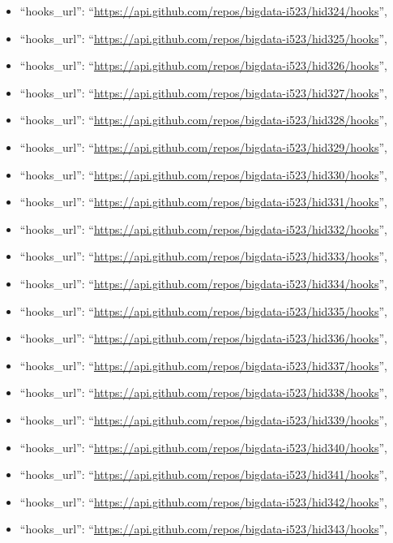 \begin{itemize}
\item
  ``hooks\_url'':
  ``\url{https://api.github.com/repos/bigdata-i523/hid324/hooks}'',
\item
  ``hooks\_url'':
  ``\url{https://api.github.com/repos/bigdata-i523/hid325/hooks}'',
\item
  ``hooks\_url'':
  ``\url{https://api.github.com/repos/bigdata-i523/hid326/hooks}'',
\item
  ``hooks\_url'':
  ``\url{https://api.github.com/repos/bigdata-i523/hid327/hooks}'',
\item
  ``hooks\_url'':
  ``\url{https://api.github.com/repos/bigdata-i523/hid328/hooks}'',
\item
  ``hooks\_url'':
  ``\url{https://api.github.com/repos/bigdata-i523/hid329/hooks}'',
\item
  ``hooks\_url'':
  ``\url{https://api.github.com/repos/bigdata-i523/hid330/hooks}'',
\item
  ``hooks\_url'':
  ``\url{https://api.github.com/repos/bigdata-i523/hid331/hooks}'',
\item
  ``hooks\_url'':
  ``\url{https://api.github.com/repos/bigdata-i523/hid332/hooks}'',
\item
  ``hooks\_url'':
  ``\url{https://api.github.com/repos/bigdata-i523/hid333/hooks}'',
\item
  ``hooks\_url'':
  ``\url{https://api.github.com/repos/bigdata-i523/hid334/hooks}'',
\item
  ``hooks\_url'':
  ``\url{https://api.github.com/repos/bigdata-i523/hid335/hooks}'',
\item
  ``hooks\_url'':
  ``\url{https://api.github.com/repos/bigdata-i523/hid336/hooks}'',
\item
  ``hooks\_url'':
  ``\url{https://api.github.com/repos/bigdata-i523/hid337/hooks}'',
\item
  ``hooks\_url'':
  ``\url{https://api.github.com/repos/bigdata-i523/hid338/hooks}'',
\item
  ``hooks\_url'':
  ``\url{https://api.github.com/repos/bigdata-i523/hid339/hooks}'',
\item
  ``hooks\_url'':
  ``\url{https://api.github.com/repos/bigdata-i523/hid340/hooks}'',
\item
  ``hooks\_url'':
  ``\url{https://api.github.com/repos/bigdata-i523/hid341/hooks}'',
\item
  ``hooks\_url'':
  ``\url{https://api.github.com/repos/bigdata-i523/hid342/hooks}'',
\item
  ``hooks\_url'':
  ``\url{https://api.github.com/repos/bigdata-i523/hid343/hooks}'',

\end{itemize}
